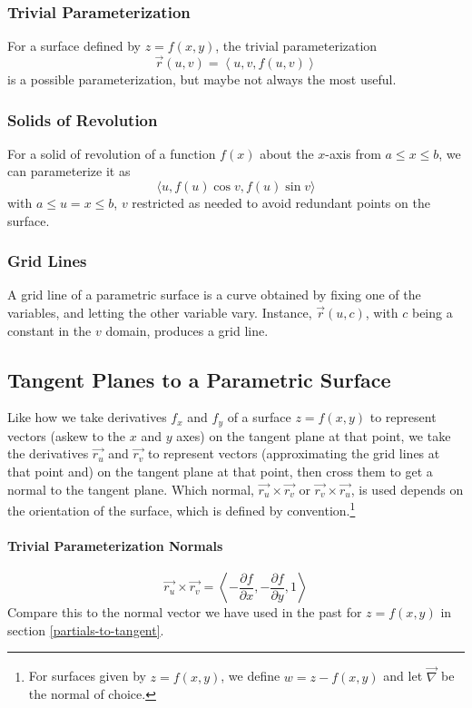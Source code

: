 \documentclass{article}
\newcommand{\vect}[1]{\ensuremath{\overrightarrow{#1}}}
\begin{document}
\subsubsection{Trivial Parameterization}
For a surface defined by $z=f(x,y)$, the trivial parameterization
$$\vect{r}(u,v)=\left\langle u,v,f(u,v) \right\rangle$$
is a possible parameterization, but maybe not always the most useful.

\subsubsection{Solids of Revolution}
For a solid of revolution of a function $f(x)$ about the $x$-axis from $a\le x\le b$, we can parameterize it as
$$\langle u, f(u)\cos v, f(u) \sin v\rangle$$
with $a \le u=x \le b$, $v$ restricted as needed to avoid redundant points on the surface.

\subsubsection{Grid Lines}
A grid line of a parametric surface is a curve obtained by fixing one of the variables, and letting the other variable vary. Instance, $\vect{r}(u,c)$, with $c$ being a constant in the $v$ domain, produces a grid line.

\subsection{Tangent Planes to a Parametric Surface}
Like how we take derivatives $f_x$ and $f_y$ of a surface $z=f(x,y)$ to represent vectors (askew to the $x$ and $y$ axes) on the tangent plane at that point, we take the derivatives $\vect{r_u}$ and $\vect{r_v}$ to represent vectors (approximating the grid lines at that point and) on the tangent plane at that point, then cross them to get a normal to the tangent plane. Which normal, $\vect{r_u}\times\vect{r_v}$ or $\vect{r_v}\times\vect{r_u}$, is used depends on the orientation of the surface, which is defined by convention.\footnote{For surfaces given by $z=f(x,y)$, we define $w=z-f(x,y)$ and let $\vect{\nabla}$ be the normal of choice.}

\paragraph{Trivial Parameterization Normals}
$$\vect{r_u}\times\vect{r_v}=\left\langle-\frac{\partial f}{\partial x},-\frac{\partial f}{\partial y}, 1\right\rangle$$
Compare this to the normal vector we have used in the past for $z=f(x,y)$ in section \ref{partials-to-tangent}.
\end{document}
